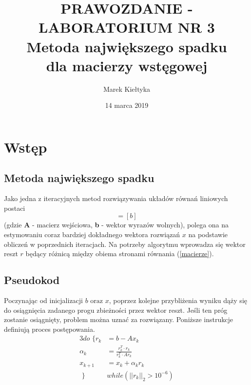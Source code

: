

\title{\Large\vspace{-2.5cm}{\Huge S}PRAWOZDANIE - LABORATORIUM NR {\Huge3}\\
		\textbf{Metoda największego spadku \\dla macierzy wstęgowej} } 
\date{\Large14 marca 2019}
\author{\Large Marek Kiełtyka}


\maketitle

\section{Wstęp}
	
\subsection{Metoda największego spadku}

Jako jedna z iteracyjnych metod rozwiązywania układów równań liniowych postaci
\begin{equation}
[A][x] = [b] 
\label{macierze}
\end{equation} (gdzie \textbf{A} - macierz wejściowa, \textbf{b} - wektor wyrazów wolnych), polega ona na estymowaniu coraz bardziej dokładnego wektora rozwiązań $ x $ na podstawie obliczeń w poprzednich iteracjach. Na potrzeby algorytmu wprowadza się wektor reszt $ r $ będący różnicą między obiema stronami równania (\ref{macierze}). 

\subsection{Pseudokod}

Poczynając od inicjalizacji $b \text{ oraz } x$, poprzez kolejne przybliżenia wyniku dąży się do osiągnięcia zadanego progu zbieżności przez wektor reszt. Jeśli ten próg zostanie osiągnięty, problem można uznać za rozwiązany. Poniższe instrukcje definiują proces postępowania.
\begin{alignat*}{3}
	do \text{ \{ } r_k &= b - Ax_k \\
	\alpha_k &= \frac{r^T_k \cdot r_k}{r^T_k \cdot Ar_k} \\
	x_{k+1} &= x_k + \alpha_kr_k \\
\text{ \} } &while (||r_k||_2 > 10^{-6}) 
\end{alignat*}

